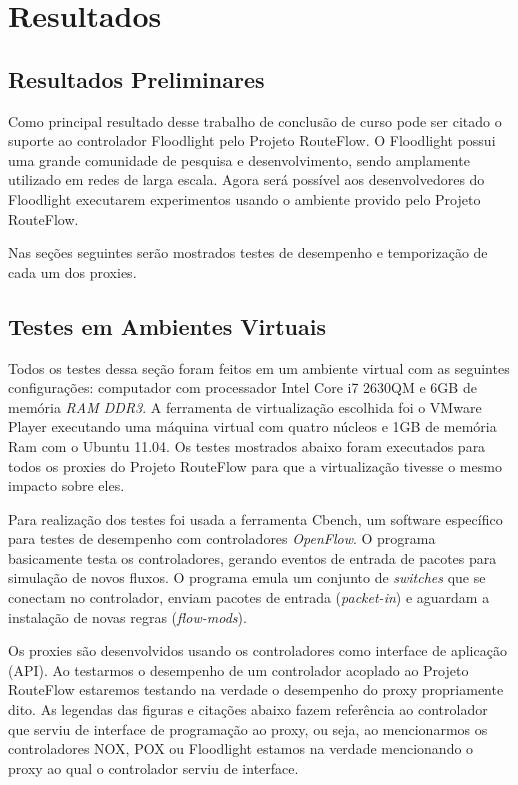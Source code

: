 \chapter{Resultados}

\section{Resultados Preliminares}

Como principal resultado desse trabalho de conclusão de 
curso pode ser citado o suporte ao controlador Floodlight 
pelo Projeto RouteFlow. O Floodlight possui uma grande
comunidade de pesquisa e desenvolvimento, sendo 
amplamente utilizado em redes de larga escala. Agora será
possível aos desenvolvedores do Floodlight executarem 
experimentos usando o ambiente provido pelo Projeto
RouteFlow.

Nas seções seguintes serão mostrados testes de desempenho
 e temporização de cada um dos proxies.

\section{Testes em Ambientes Virtuais}

Todos os testes dessa seção foram feitos em um ambiente 
virtual com as seguintes configurações: computador com
processador Intel Core i7 2630QM e 6GB de memória \textit{RAM 
DDR3}. A ferramenta de virtualização escolhida foi o VMware
 Player executando uma máquina virtual com quatro núcleos 
e 1GB de memória Ram com o Ubuntu 11.04. Os testes 
mostrados abaixo foram executados para
todos os proxies do Projeto RouteFlow para que a 
virtualização tivesse o mesmo impacto sobre eles.

Para realização dos testes foi usada a ferramenta Cbench,
um software específico para testes de desempenho com 
controladores \textit{OpenFlow}. O programa basicamente
testa os controladores, gerando eventos de entrada de 
pacotes para simulação de novos fluxos. O programa emula
 um conjunto de \textit{switches} que se conectam no 
controlador, enviam pacotes de entrada (\textit{packet-in})
e aguardam a instalação de novas regras (\textit{flow-mods}).

Os proxies são desenvolvidos usando os controladores como
interface de aplicação (API). Ao testarmos o desempenho 
de um controlador acoplado ao Projeto RouteFlow estaremos
testando na verdade o desempenho do proxy propriamente 
dito. As legendas das figuras e citações abaixo fazem
referência ao controlador que serviu de interface de programação
ao proxy, ou seja, ao mencionarmos os controladores NOX,
POX ou Floodlight estamos na verdade mencionando
o proxy ao qual o controlador serviu de interface. 

